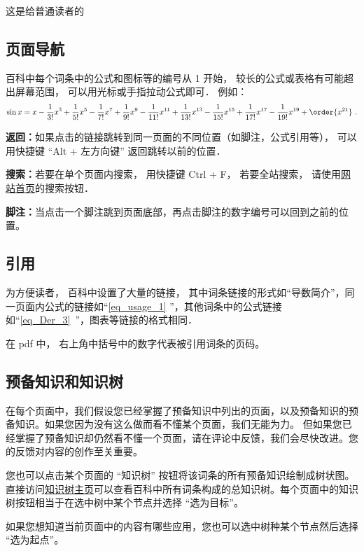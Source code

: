 
这是给普通读者的

\subsection{页面导航}
百科中每个词条中的公式和图标等的编号从 1 开始， 较长的公式或表格有可能超出屏幕范围， 可以用光标或手指拉动公式即可． 例如：
\begin{equation}\label{eq_usage_1}
\sin x = x - \frac{1}{3!} x^3 + \frac{1}{5!} x^5 - \frac{1}{7!} x^7+\frac{1}{9!} x^9-\frac{1}{11!} x^{11}+\frac{1}{13!} x^{13}-\frac{1}{15!} x^{15}+\frac{1}{17!} x^{17}-\frac{1}{19!} x^{19}+ \order{x^{21}}~.
\end{equation}

\textbf{返回：}如果点击的链接跳转到同一页面的不同位置（如脚注，公式引用等）， 可以用快捷键 “Alt + 左方向键” 返回跳转以前的位置．

\textbf{搜索：}若要在单个页面内搜索， 用快捷键 Ctrl + F， 若要全站搜索， 请使用\href{https://wuli.wiki}{网站首页}的搜索按钮．

\textbf{脚注：}当点击一个脚注跳到页面底部，再点击脚注的数字编号可以回到之前的位置。

\subsection{引用}
为方便读者， 百科中设置了大量的链接， 其中词条链接的形式如“导数简介”，同一页面内公式的链接如“\autoref{eq_usage_1} ”，其他词条中的公式链接如“\autoref{eq_Der_3}~”，图表等链接的格式相同．

在 pdf 中， 右上角中括号中的数字代表被引用词条的页码。

\subsection{预备知识和知识树}
在每个页面中，我们假设您已经掌握了预备知识中列出的页面，以及预备知识的预备知识。如果您因为没有这么做而看不懂某个页面，我们无能为力。 但如果您已经掌握了预备知识却仍然看不懂一个页面，请在评论中反馈，我们会尽快改进。您的反馈对内容的创作至关重要。

您也可以点击某个页面的 “知识树” 按钮将该词条的所有预备知识绘制成树状图。 直接访问\href{https://wuli.wiki/tree/}{知识树主页}可以查看百科中所有词条构成的总知识树。每个页面中的知识树按钮相当于在选中树中某个节点并选择 “选为目标”。

如果您想知道当前页面中的内容有哪些应用，您也可以选中树种某个节点然后选择 “选为起点”。
